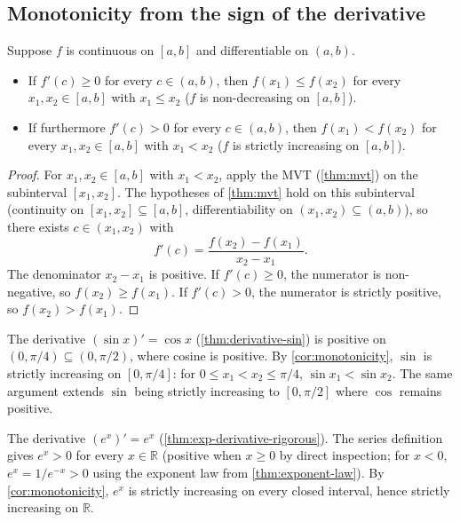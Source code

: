 \subsection{Monotonicity from the sign of the derivative}

\begin{corollary}\label{cor:monotonicity}
Suppose \(f\) is continuous on \([a, b]\) and differentiable on \((a, b)\).
\begin{itemize}
    \item If \(f'(c) \geq 0\) for every \(c \in (a, b)\), then \(f(x_{1}) \leq f(x_{2})\) for every \(x_{1}, x_{2} \in [a, b]\) with \(x_{1} \leq x_{2}\) (\(f\) is non-decreasing on \([a, b]\)).
    \item If furthermore \(f'(c) > 0\) for every \(c \in (a, b)\), then \(f(x_{1}) < f(x_{2})\) for every \(x_{1}, x_{2} \in [a, b]\) with \(x_{1} < x_{2}\) (\(f\) is strictly increasing on \([a, b]\)).
\end{itemize}
\end{corollary}

\begin{proof}
For \(x_{1}, x_{2} \in [a, b]\) with \(x_{1} < x_{2}\), apply the MVT (\cref{thm:mvt}) on the subinterval \([x_{1}, x_{2}]\). The hypotheses of \cref{thm:mvt} hold on this subinterval (continuity on \([x_{1}, x_{2}] \subseteq [a, b]\), differentiability on \((x_{1}, x_{2}) \subseteq (a, b)\)), so there exists \(c \in (x_{1}, x_{2})\) with
\[
f'(c) = \frac{f(x_{2}) - f(x_{1})}{x_{2} - x_{1}}.
\]
The denominator \(x_{2} - x_{1}\) is positive. If \(f'(c) \geq 0\), the numerator is non-negative, so \(f(x_{2}) \geq f(x_{1})\). If \(f'(c) > 0\), the numerator is strictly positive, so \(f(x_{2}) > f(x_{1})\).
\end{proof}

\begin{example}[Sine on {\([0, \pi/4]\)}]
The derivative \((\sin x)' = \cos x\) (\cref{thm:derivative-sin}) is positive on \((0, \pi/4) \subseteq (0, \pi/2)\), where cosine is positive. By \cref{cor:monotonicity}, \(\sin\) is strictly increasing on \([0, \pi/4]\): for \(0 \leq x_{1} < x_{2} \leq \pi/4\), \(\sin x_{1} < \sin x_{2}\). The same argument extends \(\sin\) being strictly increasing to \([0, \pi/2]\) where \(\cos\) remains positive.
\end{example}

\begin{example}\label{ex:exp-strictly-increasing}
The derivative \((e^{x})' = e^{x}\) (\cref{thm:exp-derivative-rigorous}). The series definition gives \(e^{x} > 0\) for every \(x \in \mathbb{R}\) (positive when \(x \geq 0\) by direct inspection; for \(x < 0\), \(e^{x} = 1/e^{-x} > 0\) using the exponent law from \cref{thm:exponent-law}). By \cref{cor:monotonicity}, \(e^{x}\) is strictly increasing on every closed interval, hence strictly increasing on \(\mathbb{R}\).
\end{example}


